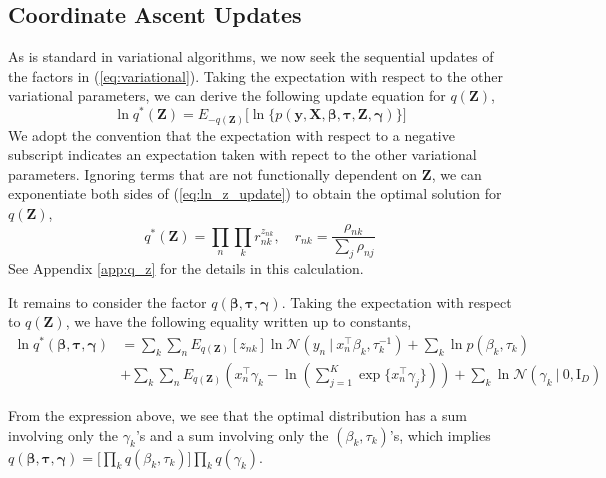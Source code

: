 \documentclass[twoside,11pt]{article}
\newcommand{\eye}{\mathrm{I}}
\newcommand\given[1][]{\:#1\vert\:}
\newcommand{\transpose}[1]{#1^{\intercal}}
\newcommand{\kprod}{\prod_{k}}
\newcommand{\nsum}{\sum_{n}}
\newcommand{\ksum}{\sum_{k}}
\newcommand{\boldbeta}{\boldsymbol\beta}
\newcommand{\boldgamma}{\boldsymbol\gamma}
\newcommand{\boldtau}{\boldsymbol\tau}
\newcommand{\sumexp}{\sum_{j=1}^{K} \exp \{ \transpose{x_n} \gamma_j \}}
\newcommand{\pr}[1]{p \left( #1 \right)}
\begin{document}
\subsection{Coordinate Ascent Updates}

As is standard in variational algorithms, we now seek the sequential updates of the factors in (\ref{eq:variational}). Taking the expectation with respect to the other variational parameters, we can derive the following update equation for $q(\mathbf{Z})$,
\begin{equation} \label{eq:ln_z_update}
	\ln q^{*}(\mathbf{Z}) = E_{-q(\mathbf{Z})} \Big[ \ln \big\{ \pr{\mathbf{y}, \mathbf{X}, \boldbeta, \boldtau, \mathbf{Z}, \boldgamma} \big\} \Big]
\end{equation}
We adopt the convention that the expectation with respect to a negative subscript indicates an expectation taken with repect to the other variational parameters. Ignoring terms that are not functionally dependent on $\mathbf{Z}$, we can exponentiate both sides of (\ref{eq:ln_z_update}) to obtain the optimal solution for $q(\mathbf{Z})$,
\begin{equation} \label{optimal_z}
	 q^{*}(\mathbf{Z}) = \prod_{n} \prod_{k} r_{nk}^{z_{nk}}, \quad r_{nk} = \frac{\rho_{nk}}{\sum_{j} \rho_{nj}}
\end{equation}
See Appendix \ref{app:q_z} for the details in this calculation. %

It remains to consider the factor $q( \boldbeta, \boldtau, \boldgamma )$. Taking the expectation with respect to $q(\mathbf{Z})$, we have the following equality written up to constants,
\begin{equation} \label{eq:ln_beta_tau_gamma}
\begin{split}
	\ln q^{*}(\boldbeta, \boldtau, \boldgamma) &=  \ksum \nsum  E_{q(\mathbf{Z})}[z_{nk}] \ln \mathcal{N} \left( y_n \given \transpose{x_n} \beta_k, \tau_{k}^{-1} \right) + \ksum \ln \pr{\beta_k, \tau_k} \\
	& + \ksum \nsum E_{q(\mathbf{Z})} \left( \transpose{x_n} \gamma_k - \ln \left( \sumexp\right)\right) + \ksum \ln \mathcal{N}(\gamma_k \given 0, \eye_D)
\end{split}
\end{equation}

From the expression above, we see that the optimal distribution has a sum involving only the $\gamma_k$'s and a sum involving only the $(\beta_k, \tau_k)$'s, which implies $q(\boldbeta, \boldtau, \boldgamma) = \big[ \kprod q(\beta_k, \tau_k) \big] \kprod q(\gamma_k)$.
\end{document}
